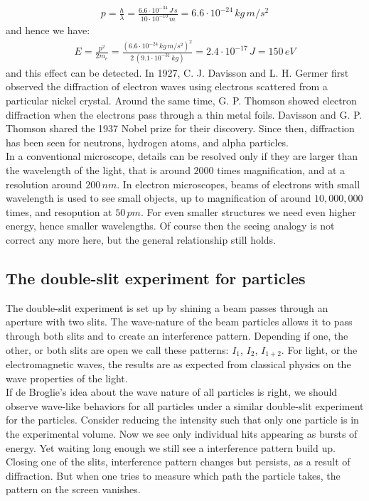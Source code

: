 \documentclass[11pt]{article}
\theoremstyle{break}
\theoremstyle{break}
\newcommand{\ee}[1]{\cdot 10^{#1}}
\begin{document}
\begin{align*}
p = \frac{h}{\lambda} = \frac{6.6\ee{-34}\, J\,s}{10\ee{-10}\, m} = 6.6\ee{-24}\, kg\, m/s^2
\end{align*}
and hence we have:
\begin{align*}
E = \frac{p^2}{2m_e} = \frac{(6.6\ee{-24}\, kg\, m/s^2)^2}{2\, (9.1\ee{-31}\, kg)} = 2.4\ee{-17}\, J = 150\, eV
\end{align*}
and this effect can be detected. In 1927, C. J. Davisson and L. H. Germer first observed the diffraction of electron waves using electrons scattered from a particular nickel crystal. Around the same time, G. P. Thomson showed electron diffraction when the electrons pass through a thin metal foils. Davisson and G. P. Thomson shared the 1937 Nobel prize for their discovery. Since then, diffraction has been seen for neutrons, hydrogen atoms, and alpha particles.\\

In a conventional microscope, details can be resolved only if they are larger than the wavelength of the light, that is around $2000$ times magnification, and at a resolution around $200\, nm$. In electron microscopes, beams of electrons with small wavelength is used to see small objects, up to magnification of around $10,000,000$ times, and resopution at $50\, pm$. For even smaller structures we need even higher energy, hence smaller wavelengths. Of course then the seeing analogy is not correct any more here, but the general relationship still holds. \\

\subsection{The double-slit experiment for particles}
The double-slit experiment is set up by shining a beam passes through an aperture with two slits. The wave-nature of the beam particles allows it to pass through both slits and to create an interference pattern. Depending if one, the other, or both slits are open we call these patterns: $I_1$, $I_2$, $I_{1+2}$. For light, or the electromagnetic waves, the results are as expected from classical physics on the wave properties of the light.\\

If de Broglie's idea about the wave nature of all particles is right, we should observe wave-like behaviors for all particles under a similar double-slit experiment for the particles. Consider reducing the intensity such that only one particle is in the experimental volume. Now we see only individual hits appearing as bursts of energy. Yet waiting long enough we still see a interference pattern build up. Closing one of the slits, interference pattern changes but persists, as a result of diffraction. But when one tries to measure which path the particle takes, the pattern on the screen vanishes.\\
\end{document}

